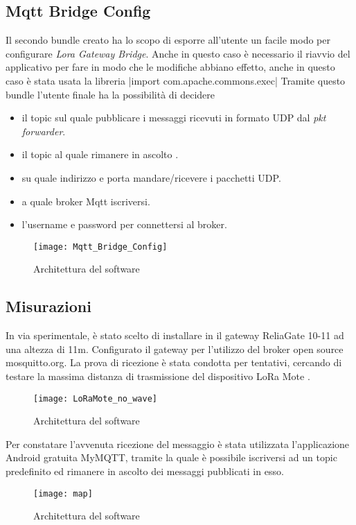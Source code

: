 \subsection{Mqtt Bridge Config}
Il secondo bundle creato ha lo scopo di esporre all'utente un facile modo per
configurare  \emph{Lora Gateway Bridge}.  Anche in questo caso è necessario il
riavvio del applicativo per fare in modo che le modifiche abbiano effetto, anche
in questo caso è stata usata la libreria
|import com.apache.commons.exec|
Tramite questo bundle l'utente finale ha la possibilità di decidere 
\begin{itemize}
\item il topic sul quale pubblicare i messaggi ricevuti in formato UDP dal
\emph{pkt forwarder}.
\item il topic al quale rimanere in ascolto .
\item su quale indirizzo e porta mandare/ricevere i pacchetti UDP.
\item a quale broker Mqtt iscriversi.
\item l'username e password per connettersi al broker.
\end{itemize}

\begin{figure}[h]
\centering 
\texttt{[image: Mqtt\_Bridge\_Config]}
\caption{Architettura del software}
\label{fig:Software_stack}
\end{figure}

\subsection{Misurazioni}
In via sperimentale, è stato scelto di installare in  il gateway
ReliaGate 10-11 ad una altezza di 11m. Configurato il gateway per l'utilizzo del
broker open source  mosquitto.org. La prova di ricezione è stata condotta per
tentativi, cercando di testare la massima distanza di trasmissione del
dispositivo LoRa Mote . 

\begin{figure}[h]
\centering 
\texttt{[image: LoRaMote\_no\_wave]}
\caption{Architettura del software}
\label{fig:Software_stack}
\end{figure}

Per constatare l'avvenuta ricezione del
messaggio è stata utilizzata l'applicazione Android gratuita MyMQTT, tramite la
quale è  possibile iscriversi ad un topic predefinito ed rimanere in ascolto dei
messaggi pubblicati in esso. 

\begin{figure}[h]
\centering 
\texttt{[image: map]}
\caption{Architettura del software}
\label{fig:Software_stack}
\end{figure}

